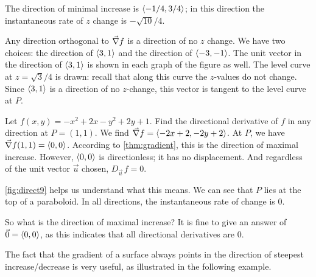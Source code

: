 \begin{example}

The direction of minimal increase is $\left\langle -1/4,3/4\right\rangle$; in this direction the instantaneous rate of $z$ change is $-\sqrt{10}/4%
$.

Any direction orthogonal to $\vec\nabla f$ is a direction of no $z$ change. We have two choices: the direction of $\left\langle 3,1\right\rangle$ and the direction of $\left\langle -3,-1\right\rangle$. The unit vector in the direction of $\left\langle 3,1\right\rangle$ is shown in each graph of the figure as well. The level curve at $z=\sqrt{3}/4$ is drawn: recall that along this curve the $z$-values do not change. Since $\left\langle 3,1\right\rangle$ is a direction of no $z$-change, this vector is tangent to the level curve at $P$.
\end{example}

\begin{example}[Understanding when $\grad f = \vec 0$]\label{ex_direct9}%
Let $f(x,y) = -x^2+2x-y^2+2y+1$. Find the directional derivative of $f$ in any direction at $P=(1,1)$.
\solution
We find $\vec\nabla f =\left\langle -2x+2, -2y+2\right\rangle$. At $P$, we have $\vec\nabla f(1,1) =\left\langle 0,0\right\rangle$. 
According to \autoref{thm:gradient}, this is the direction of maximal increase. However, $\left\langle 0,0\right\rangle$ is directionless; it has no displacement. And regardless of the unit vector $\vec u$ chosen, $D_{\vec u\,}f = 0$.


\autoref{fig:direct9} helps us understand what this means. We can see that $P$ lies at the top of a paraboloid. In all directions, the instantaneous rate of change is 0. 

So what is the direction of maximal increase? It is fine to give an answer of $\vec 0 =\left\langle 0,0\right\rangle$, as this indicates that all directional derivatives are 0.
\end{example}

The fact that the gradient of a surface always points in the direction of steepest increase/decrease is very useful, as illustrated in the following example.

